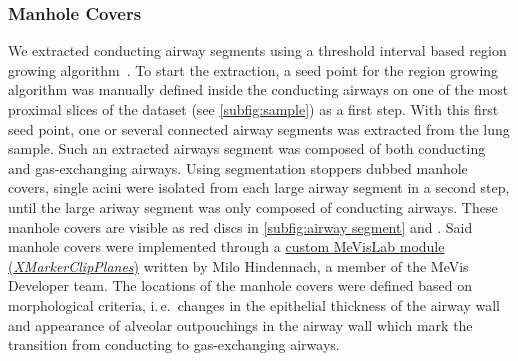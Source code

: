 \documentclass[%
	twoside,
	paper=a4,%
	abstract=true,%
	]{scrartcl}
\newcommand{\ie}{i.\,e.\ }
\begin{document}
\subsubsection{Manhole Covers}
We extracted conducting airway segments using a threshold interval based region growing algorithm~\cite{Zucker1976}. To start the extraction, a seed point for the region growing algorithm was manually defined inside the conducting airways on one of the most proximal slices of the dataset (see \autoref{subfig:sample}) as a first step. With this first seed point, one or several connected airway segments was extracted from the lung sample. Such an extracted airways segment was composed of both conducting and gas-exchanging airways. Using segmentation stoppers dubbed manhole covers, single acini were isolated from each large airway segment in a second step, until the large ariway segment was only composed of conducting airways. These manhole covers are visible as red discs in \autoref{subfig:airway segment} and . Said manhole covers were implemented through a \href{http://www.mevis-research.de/cgi-bin/discus/board-auth.cgi?lm=1282233250&file=/839/11760.html}{custom MeVisLab module (\emph{XMarkerClipPlanes})} written by Milo Hindennach, a member of the MeVis Developer team. The locations of the manhole covers were defined based on morphological criteria, \ie changes in the epithelial thickness of the airway wall and appearance of alveolar outpouchings in the airway wall which mark the transition from conducting to gas-exchanging airways.
\end{document}
